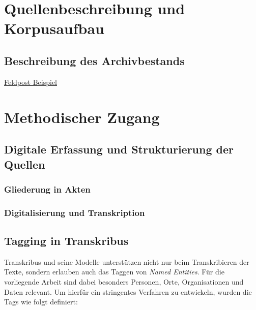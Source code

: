 \documentclass[12pt, a4paper, ngerman, bidi=default]{article}
\begin{document}
\section{Quellenbeschreibung und Korpusaufbau}
  \subsection{Beschreibung des Archivbestands}
    \newpage

    \href{https://free.iiifhosting.com/iiif/959173f8d808ab12ad7847917f79e0e4bc974ebce0040a07afd4b8be3f10c234/}{Feldpost Beispiel}
    
    
    \section{Methodischer Zugang}
    
    \subsection{Digitale Erfassung und Strukturierung der Quellen}
    \subsubsection{Gliederung in Akten}
    \subsubsection{Digitalisierung und Transkription}
    
    \subsection{Tagging in Transkribus} 

    Transkribus und seine Modelle unterstützen nicht nur beim Transkribieren der Texte, sondern erlauben auch das Taggen von \textit{Named Entities}.  
    Für die vorliegende Arbeit sind dabei besonders Personen, Orte, Organisationen und Daten relevant.  
    Um hierfür ein stringentes Verfahren zu entwickeln, wurden die Tags wie folgt definiert:
    
\end{document}
